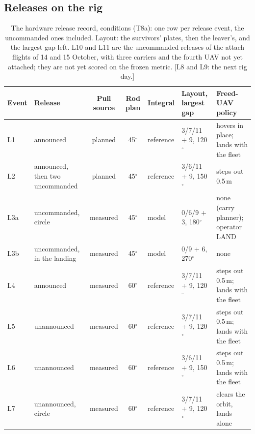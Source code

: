 \subsection{Releases on the rig}

\begin{table}[htbp]
  \centering
  \footnotesize
  \caption[The rig release record: conditions]{The hardware release record, conditions (T8a): one row per release
  event, the uncommanded ones included. Layout: the survivors' plates, then the leaver's, and the largest gap left.
  L10 and L11 are the uncommanded releases of the attach flights of 14 and 15 October, with three carriers and the
  fourth UAV not yet attached; they are not yet scored on the frozen metric. [L8 and L9: the next rig day.]}
  \label{tab:T8a}
  \begin{tabularx}{\textwidth}{lYccYYY}
    \toprule
    Event & Release & Pull source & Rod plan & Integral & Layout, largest gap & Freed-UAV policy \\
    \midrule
    L1 & announced & planned & 45$^\circ$ & reference & 3/7/11 + 9, 120$^\circ$ & hovers in place; lands with the fleet \\ %
    L2 & announced, then two uncommanded & planned & 45$^\circ$ & reference & 3/6/11 + 9, 150$^\circ$ & steps out 0.5\,m \\ %
    L3a & uncommanded, circle & measured & 45$^\circ$ & model & 0/6/9 + 3, 180$^\circ$ & none (carry planner); operator LAND \\ %
    L3b & uncommanded, in the landing & measured & 45$^\circ$ & model & 0/9 + 6, 270$^\circ$ & none \\ %
    L4 & announced & measured & 60$^\circ$ & reference & 3/7/11 + 9, 120$^\circ$ & steps out 0.5\,m; lands with the fleet \\ %
    L5 & unannounced & measured & 60$^\circ$ & reference & 3/7/11 + 9, 120$^\circ$ & steps out 0.5\,m; lands with the fleet \\ %
    L6 & unannounced & measured & 60$^\circ$ & reference & 3/6/11 + 9, 150$^\circ$ & steps out 0.5\,m; lands with the fleet \\ %
    L7 & unannounced, circle & measured & 60$^\circ$ & reference & 3/7/11 + 9, 120$^\circ$ & clears the orbit, lands alone \\ %

\end{tabularx}
\end{table}
